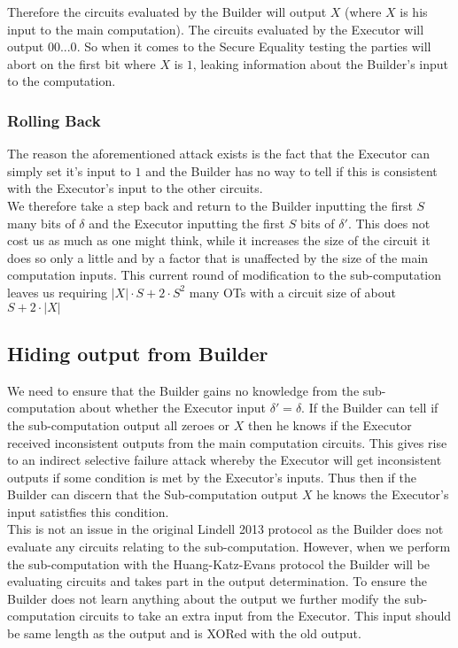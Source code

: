 \documentclass[ %
                    author={Nicholas Tutte},
                supervisor={Prof. Nigel Smart},
                    degree={MEng},
                     title={Secure Two Party Computation},
                  subtitle={A practical comparison of recent protocols},
                      type={Research - GG1K},
                      year={2015} ]{dissertation}
\begin{document}
					Therefore the circuits evaluated by the Builder will output $X$ (where $X$ is his input to the main computation). The circuits evaluated by the Executor will output $00...0$. So when it comes to the Secure Equality testing the parties will abort on the first bit where $X$ is $1$, leaking information about the Builder's input to the computation.\\

				\subsubsection{Rolling Back}
					The reason the aforementioned attack exists is the fact that the Executor can simply set it's input to $1$ and the Builder has no way to tell if this is consistent with the Executor's input to the other circuits.\\

					We therefore take a step back and return to the Builder inputting the first $S$ many bits of $\delta$ and the Executor inputting the first $S$ bits of $\delta'$. This does not cost us as much as one might think, while it increases the size of the circuit it does so only a little and by a factor that is unaffected by the size of the main computation inputs. This current round of modification to the sub-computation leaves us requiring $|X| \cdot S + 2 \cdot S^2$ many OTs with a circuit size of about $S + 2 \cdot |X|$\\

			\subsection{Hiding output from Builder}
				We need to ensure that the Builder gains no knowledge from the sub-computation about whether the Executor input $\delta' = \delta$. If the Builder can tell if the sub-computation output all zeroes or $X$ then he knows if the Executor received inconsistent outputs from the main computation circuits. This gives rise to an indirect selective failure attack whereby the Executor will get inconsistent outputs if some condition is met by the Executor's inputs. Thus then if the Builder can discern that the Sub-computation output $X$ he knows the Executor's input satistfies this condition.\\

				This is not an issue in the original Lindell 2013 protocol as the Builder does not evaluate any circuits relating to the sub-computation. However, when we perform the sub-computation with the Huang-Katz-Evans protocol the Builder will be evaluating circuits and takes part in the output determination. To ensure the Builder does not learn anything about the output we further modify the sub-computation circuits to take an extra input from the Executor. This input should be same length as the output and is XORed with the old output.\\
\end{document}
